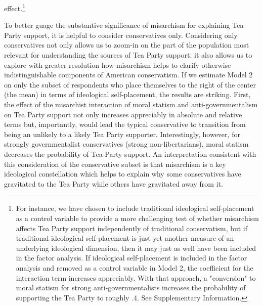 \documentclass[12pt,]{article}
\let\rmarkdownfootnote\footnote%
\def\footnote{\protect\rmarkdownfootnote}
\begin{document}
effect.\footnote{For instance, we have chosen to include traditional ideological self-placement as a control variable to provide a more challenging test of whether misarchism affects Tea Party support independently of traditional conservatism, but if traditional ideological self-placement is just yet another measure of an underlying ideological dimension, then it may just as well have been included in the factor analysis. If ideological self-placement is included in the factor analysis and removed as a control variable in Model 2, the coefficient for the interaction term increases appreciably. With that approach, a "conversion" to moral statism for strong anti-governmentalists increases the probability of supporting the Tea Party to roughly .4. See Supplementary Information.}

To better guage the substantive significance of misarchism for
explaining Tea Party support, it is helpful to consider conservatives
only. Considering only conservatives not only allows us to zoom-in on
the part of the population most relevant for understanding the sources
of Tea Party support; it also allows us to explore with greater
resolution how misarchism helps to clarify otherwise indistinguishable
components of American conservatism. If we estimate Model 2 on only the
subset of respondents who place themselves to the right of the center
(the mean) in terms of ideological self-placement, the results are
striking. First, the effect of the misarchist interaction of moral
statism and anti-governmentalism on Tea Party support not only increases
appreciably in absolute and relative terms but, importantly, would lead
the typical conservative to transition from being an unlikely to a
likely Tea Party supporter. Interestingly, however, for strongly
governmentalist conservatives (strong non-libertarians), moral statism
decreases the probability of Tea Party support. An interpretation
consistent with this consideration of the conservative subset is that
misarchism is a key ideological constellation which helps to explain why
some conservatives have gravitated to the Tea Party while others have
gravitated away from it.
\end{document}
